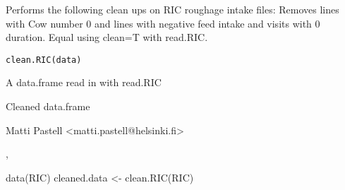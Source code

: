 \begin{Description}\relax
Performs the following clean ups on RIC roughage intake files:
Removes lines with Cow number 0 and lines with negative feed intake
and visits with 0 duration. Equal using clean=T with read.RIC.
\end{Description}
\begin{Usage}
\begin{verbatim}
clean.RIC(data)
\end{verbatim}
\end{Usage}
\begin{Arguments}
\begin{ldescription}
\item[\code{data}] A data.frame read in with read.RIC
\end{ldescription}
\end{Arguments}
\begin{Value}
Cleaned data.frame
\end{Value}
\begin{Author}\relax
Matti Pastell <matti.pastell@helsinki.fi>
\end{Author}
\begin{SeeAlso}\relax
{}, 
\end{SeeAlso}
\begin{Examples}
\begin{ExampleCode}
data(RIC)
cleaned.data <- clean.RIC(RIC)
\end{ExampleCode}
\end{Examples}

